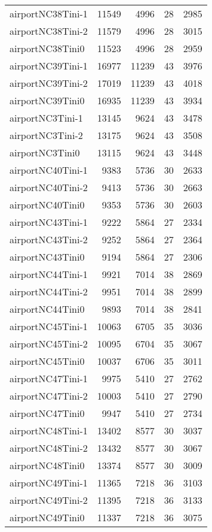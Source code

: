 \begin{tabular}{lrrrr}
airportNC38Tini-1 & 11549 & 4996 & 28 & 2985 \\
airportNC38Tini-2 & 11579 & 4996 & 28 & 3015 \\
airportNC38Tini0 & 11523 & 4996 & 28 & 2959 \\
airportNC39Tini-1 & 16977 & 11239 & 43 & 3976 \\
airportNC39Tini-2 & 17019 & 11239 & 43 & 4018 \\
airportNC39Tini0 & 16935 & 11239 & 43 & 3934 \\
airportNC3Tini-1 & 13145 & 9624 & 43 & 3478 \\
airportNC3Tini-2 & 13175 & 9624 & 43 & 3508 \\
airportNC3Tini0 & 13115 & 9624 & 43 & 3448 \\
airportNC40Tini-1 & 9383 & 5736 & 30 & 2633 \\
airportNC40Tini-2 & 9413 & 5736 & 30 & 2663 \\
airportNC40Tini0 & 9353 & 5736 & 30 & 2603 \\
airportNC43Tini-1 & 9222 & 5864 & 27 & 2334 \\
airportNC43Tini-2 & 9252 & 5864 & 27 & 2364 \\
airportNC43Tini0 & 9194 & 5864 & 27 & 2306 \\
airportNC44Tini-1 & 9921 & 7014 & 38 & 2869 \\
airportNC44Tini-2 & 9951 & 7014 & 38 & 2899 \\
airportNC44Tini0 & 9893 & 7014 & 38 & 2841 \\
airportNC45Tini-1 & 10063 & 6705 & 35 & 3036 \\
airportNC45Tini-2 & 10095 & 6704 & 35 & 3067 \\
airportNC45Tini0 & 10037 & 6706 & 35 & 3011 \\
airportNC47Tini-1 & 9975 & 5410 & 27 & 2762 \\
airportNC47Tini-2 & 10003 & 5410 & 27 & 2790 \\
airportNC47Tini0 & 9947 & 5410 & 27 & 2734 \\
airportNC48Tini-1 & 13402 & 8577 & 30 & 3037 \\
airportNC48Tini-2 & 13432 & 8577 & 30 & 3067 \\
airportNC48Tini0 & 13374 & 8577 & 30 & 3009 \\
airportNC49Tini-1 & 11365 & 7218 & 36 & 3103 \\
airportNC49Tini-2 & 11395 & 7218 & 36 & 3133 \\
airportNC49Tini0 & 11337 & 7218 & 36 & 3075 \\

\end{tabular}
